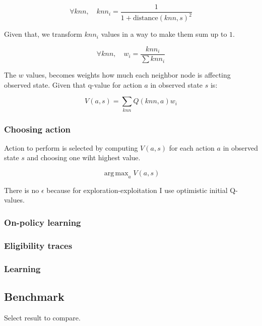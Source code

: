 \documentclass[12pt]{article}
\DeclareMathOperator*{\argmax}{arg\,max}
\begin{document}
\begin{equation}
\forall knn, \quad knn_i = \frac{1}{1+\text{distance}(knn, s)^2}
\end{equation}

Given that, we transform $knn_i$ values in a way to make them sum up to $1$.

\begin{equation}
\forall knn, \quad w_i = \frac{knn_i}{\sum knn_i}
\end{equation}

The $w$ values, becomes weights how much each neighbor node is affecting observed state. Given that q-value for action $a$ in observed state $s$ is:

\begin{equation}
V(a, s) = \sum_{knn} Q(knn, a)w_i
\end{equation}

\subsubsection{Choosing action}

Action to perform is selected by computing $V(a, s)$ for each action $a$ in observed state $s$ and choosing one wiht highest value.

\begin{equation}
\argmax_a V(a, s)
\end{equation}

There is no $\epsilon$ because for exploration-exploitation I use optimistic initial Q-values.

\subsubsection{On-policy learning}


\subsubsection{Eligibility traces}


\subsubsection{Learning}

\subsection{Benchmark}

Select result to compare.
\end{document}
